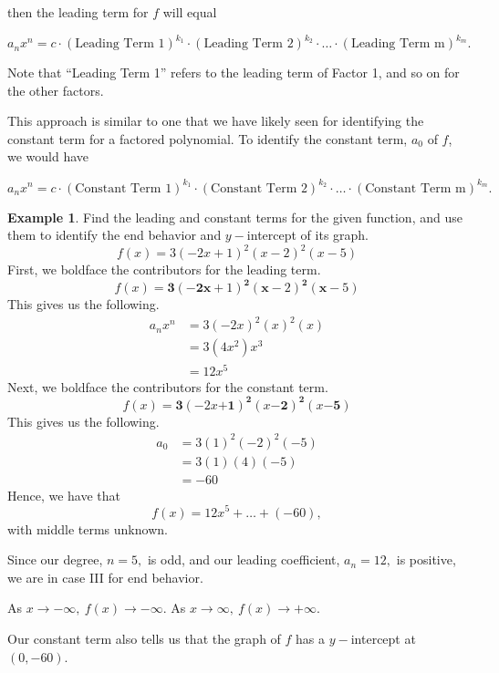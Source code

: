 \documentclass[12pt]{book}
\theoremstyle{definition}
\newtheorem{example}{Example}
\begin{document}
then the leading term for $f$ will equal
\begin{center}
$a_nx^n=c\cdot(\text{Leading Term 1})^{k_1}\cdot(\text{Leading Term 2})^{k_2}\cdot\ldots\cdot(\text{Leading Term m})^{k_m}.$
\end{center}
Note that ``Leading Term 1'' refers to the leading term of Factor 1, and so on for the other factors.
\par
This approach is similar to one that we have likely seen for identifying the constant term for a factored polynomial.  To identify the constant term, $a_0$ of $f$, we would have
\begin{center}
$a_nx^n=c\cdot(\text{Constant Term 1})^{k_1}\cdot(\text{Constant Term 2})^{k_2}\cdot\ldots\cdot(\text{Constant Term m})^{k_m}.$
\end{center}
\begin{example}\label{poly_end_beh_1}
Find the leading and constant terms for the given function, and use them to identify the end behavior and $y-$intercept of its graph.
$$f(x)=3(-2x+1)^2(x-2)^2(x-5)$$
First, we boldface the contributors for the leading term.
$$f(x)=\mathbf{3}(\mathbf{-2x}+1)^{\mathbf{2}}(\mathbf{x}-2)^{\mathbf{2}}(\mathbf{x}-5)$$
This gives us the following.
\begin{equation*}
\begin{split}
a_nx^n & =3(-2x)^{2}(x)^{2}(x)\\
& = 3(4x^2)x^3\\
& = 12x^5
\end{split}
\end{equation*}
Next, we boldface the contributors for the constant term.
$$f(x)=\mathbf{3}(-2x\mathbf{+1})^{\mathbf{2}}(x\mathbf{-2})^{\mathbf{2}}(x\mathbf{-5})$$
This gives us the following.
\begin{equation*}
\begin{split}
a_0 & = 3(1)^{2}(-2)^{2}(-5)\\
& = 3(1)(4)(-5)\\
& = -60
\end{split}
\end{equation*}
Hence, we have that
$$f(x)=12x^5+\ldots +(-60),$$
with middle terms unknown.
\par
Since our degree, $n=5,$ is odd, and our leading coefficient, $a_n=12,$ is positive, we are in case III for end behavior.
\begin{center}
As $x\rightarrow -\infty, \ f(x)\rightarrow -\infty.$ \hspace{1in} As $x\rightarrow \infty, \ f(x)\rightarrow +\infty.$
\end{center}
Our constant term also tells us that the graph of $f$ has a $y-$intercept at $(0,-60)$.
\end{example}
\end{document}

